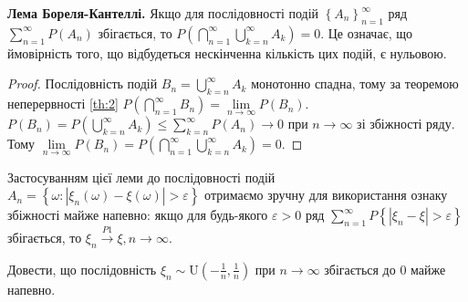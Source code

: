 \begin{enumerate}
    \textbf{Лема Бореля-Кантеллі.} Якщо для послідовності подій $\left\{A_n \right\}_{n=1}^{\infty}$ ряд
    $\sum\limits_{n=1}^{\infty} P(A_n)$ збігається, то $P\left( \bigcap\limits_{n=1}^{\infty} \bigcup\limits_{k = n}^{\infty} A_k\right) = 0$.
    Це означає, що ймовірність того, що відбудеться нескінченна кількість цих подій, є нульовою.
    \begin{proof}
        Послідовність подій $B_n = \bigcup\limits_{k = n}^{\infty} A_k$ монотонно спадна, тому за теоремою неперервності \ref{th:2}
        $P\left( \bigcap\limits_{n=1}^{\infty} B_n\right) = \underset{n\to\infty}{\lim} P(B_n)$.
        $P(B_n) = P\left( \bigcup\limits_{k = n}^{\infty} A_k\right) \leq \sum\limits_{k=n}^{\infty}P(A_n) \to 0$ при $n\to \infty$ 
        зі збіжності ряду. Тому $\underset{n\to\infty}{\lim} P(B_n) = P\left( \bigcap\limits_{n=1}^{\infty} \bigcup\limits_{k = n}^{\infty} A_k\right) = 0$.
    \end{proof}
    Застосуванням цієї леми до послідовності подій $A_n = \left\{ \omega : \left| \xi_n(\omega) - \xi(\omega)\right| > \varepsilon\right\}$ отримаємо зручну для використання
    ознаку збіжності майже напевно: якщо для будь-якого $\varepsilon >0$ ряд
    $\sum\limits_{n=1}^{\infty} P\left\{\left| \xi_n - \xi\right| > \varepsilon\right\}$ збігається, то 
    $\xi_n \overset{P1}{\longrightarrow} \xi, n \to \infty$.
    \begin{example}
        Довести, що послідовність $\xi_n \sim \mathrm{U}(-\frac{1}{n}, \frac{1}{n})$ при $n\to\infty$ збігається до 0 майже напевно.
        

\end{example}
\end{enumerate}
